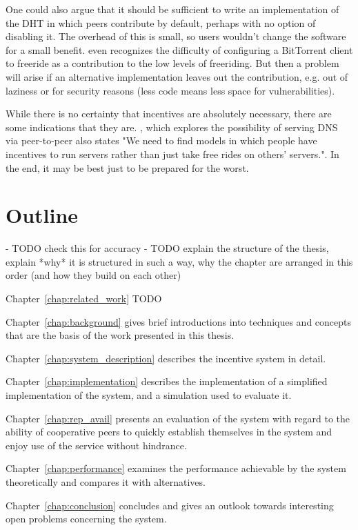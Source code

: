 One could also argue that it should be sufficient to write an implementation of
the \ac{DHT} in which peers contribute by default, perhaps with no option of
disabling it. The overhead of this is small, so users wouldn't change the
software for a small benefit. \cite{ripeanu2006gifting} even recognizes the
difficulty of configuring a BitTorrent client to freeride as a contribution to
the low levels of freeriding. But then a problem will arise if an alternative
implementation leaves out the contribution, e.g. out of laziness or for security
reasons (less code means less space for vulnerabilities).

While there is no certainty that incentives are absolutely necessary, there are
some indications that they are. \cite{cox2002serving}, which explores the
possibility of serving DNS via peer-to-peer also states "We need to find models
in which people have incentives to run servers rather than just take free rides
on others’ servers.". In the end, it may be best just to be prepared for the
worst.

\section{Outline}
- TODO check this for accuracy
- TODO explain the structure of the thesis, explain *why* it is structured in
  such a way, why the chapter are arranged in this order (and how they build on
  each other)

Chapter~\ref{chap:related_work} TODO

Chapter~\ref{chap:background} gives brief introductions into techniques and
concepts that are the basis of the work presented in this thesis.

Chapter~\ref{chap:system_description} describes the incentive system in detail.

Chapter~\ref{chap:implementation} describes the implementation of a simplified
implementation of the system, and a simulation used to evaluate it.

Chapter~\ref{chap:rep_avail} presents an evaluation of the system with regard to
the ability of cooperative peers to quickly establish themselves in the system
and enjoy use of the service without hindrance.

Chapter~\ref{chap:performance} examines the performance achievable by the system
theoretically and compares it with alternatives.

Chapter~\ref{chap:conclusion} concludes and gives an outlook towards interesting
open problems concerning the system.
